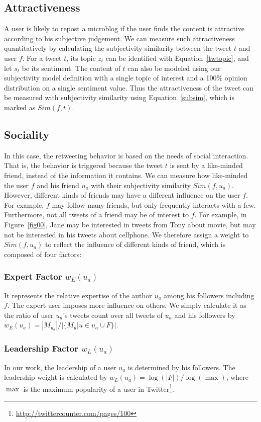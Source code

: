 \documentclass[letterpaper]{article}
\begin{document}
\subsection{Attractiveness}

A user is likely to repost a microblog if the user finds the content is attractive according to his subjective judgement. We can measure such attractiveness quantitatively by calculating the subjectivity similarity between the tweet $ t $ and user $ f $. For a tweet $ t $, its topic $ z_t $ can be identified with Equation~\ref{twtopic}, and let $ s_t $ be its sentiment. The content of $ t $ can also be modeled using our subjectivity model definition with a single topic of interest and a 100\% opinion distribution on a single sentiment value. Thus the attractiveness of the tweet can be measured with subjectivity similarity using Equation~\ref{subsim}, which is marked as $ Sim(f,t) $.

\subsection{Sociality}

In this case, the retweeting behavior is based on the needs of social interaction. That is, the behavior is triggered because the tweet $ t $ is sent by a like-minded friend, instead of the information it contains. We can measure how like-minded the user $ f $ and his friend $ u_a $ with their subjectivity similarity $ Sim(f,u_a) $.  However, different kinds of friends may have a different influence on the user $ f $. For example, $ f $ may follow many friends, but only frequently interacts with a few. Furthermore, not all tweets of a friend may be of interest to $ f $. For example, in Figure~\ref{fig00}, Jane may be interested in tweets from Tony about movie, but may not be interested in his tweets about cellphone. We therefore assign a weight to $ Sim(f,u_a) $ to reflect the influence of different kinds of friend, which
is composed of four factors:
\subsubsection{Expert Factor $ w_E(u_a) $} It represents the relative expertise of the author $ u_a $ among his followers including $ f $. The expert user imposes more influence on others. We simply calculate it as the ratio of user $ u_a $'s tweets count over all tweets of $ u_a $ and his followers by $ w_E(u_a)=|M_{u_a}|/|\{M_u|u \in u_a \cup F \}|  $.
\subsubsection{Leadership Factor $ w_L(u_a) $} In our work, the leadership of a user $ u_a $ is determined by his followers. The leadership weight is calculated by $ w_L(u_a)=\log (|F|)/\log(\max) $, where $ \max $ is the maximum popularity of a user in Twitter\footnote{\url{http://twittercounter.com/pages/100}}.
\end{document}
